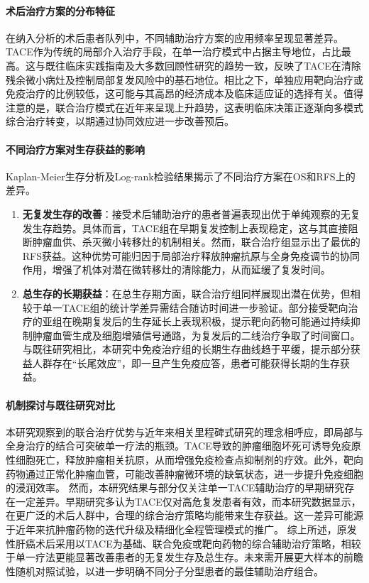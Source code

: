 \documentclass{article}
\begin{document}
\paragraph{术后治疗方案的分布特征}
在纳入分析的术后患者队列中，不同辅助治疗方案的应用频率呈现显著差异。TACE作为传统的局部介入治疗手段，在单一治疗模式中占据主导地位，占比最高。这与既往临床实践指南及大多数回顾性研究的趋势一致，反映了TACE在清除残余微小病灶及控制局部复发风险中的基石地位。相比之下，单独应用靶向治疗或免疫治疗的比例较低，这可能与其高昂的经济成本及临床适应证的选择有关。值得注意的是，联合治疗模式在近年来呈现上升趋势，这表明临床决策正逐渐向多模式综合治疗转变，以期通过协同效应进一步改善预后。

\paragraph{不同治疗方案对生存获益的影响}
Kaplan-Meier生存分析及Log-rank检验结果揭示了不同治疗方案在OS和RFS上的差异。
\begin{enumerate}
\item \textbf{无复发生存的改善}：接受术后辅助治疗的患者普遍表现出优于单纯观察的无复发生存趋势。具体而言，TACE组在早期复发控制上表现稳定，这与其直接阻断肿瘤血供、杀灭微小转移灶的机制相关。然而，联合治疗组显示出了最优的RFS获益。这种优势可能归因于局部治疗释放肿瘤抗原与全身免疫调节的协同作用，增强了机体对潜在微转移灶的清除能力，从而延缓了复发时间。
\item \textbf{总生存的长期获益}：在总生存期方面，联合治疗组同样展现出潜在优势，但相较于单一TACE组的统计学差异需结合随访时间进一步验证。部分接受靶向治疗的亚组在晚期复发后的生存延长上表现积极，提示靶向药物可能通过持续抑制肿瘤血管生成及细胞增殖信号通路，为复发后的二线治疗争取了时间窗口。与既往研究相比，本研究中免疫治疗组的长期生存曲线趋于平缓，提示部分获益人群存在“长尾效应”，即一旦产生免疫应答，患者可能获得长期的生存获益。
\end{enumerate}

\paragraph{机制探讨与既往研究对比}
本研究观察到的联合治疗优势与近年来相关里程碑式研究的理念相呼应，即局部与全身治疗的结合可突破单一疗法的瓶颈。TACE导致的肿瘤细胞坏死可诱导免疫原性细胞死亡，释放肿瘤相关抗原，从而增强免疫检查点抑制剂的疗效。此外，靶向药物通过正常化肿瘤血管，可能改善肿瘤微环境的缺氧状态，进一步提升免疫细胞的浸润效率。
然而，本研究结果与部分仅关注单一TACE辅助治疗的早期研究存在一定差异。早期研究多认为TACE仅对高危复发患者有效，而本研究数据显示，在更广泛的术后人群中，合理的综合治疗策略均能带来生存获益。这一差异可能源于近年来抗肿瘤药物的迭代升级及精细化全程管理模式的推广。
综上所述，原发性肝癌术后采用以TACE为基础、联合免疫或靶向药物的综合辅助治疗策略，相较于单一疗法更能显著改善患者的无复发生存及总生存。未来需开展更大样本的前瞻性随机对照试验，以进一步明确不同分子分型患者的最佳辅助治疗组合。
\end{document}
